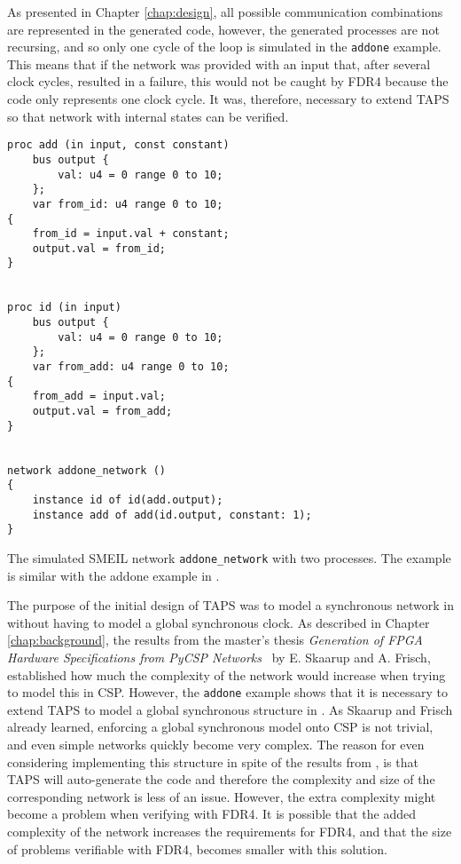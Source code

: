 As presented in Chapter \ref{chap:design}, all possible communication combinations are represented in the generated \cspm{} code, however, the generated \cspm{} processes are not recursing, and so only one cycle of the loop is simulated in the \texttt{addone} example. This means that if the network was provided with an input that, after several clock cycles, resulted in a failure, this would not be caught by FDR4 because the \cspm{} code only represents one clock cycle. It was, therefore, necessary to extend TAPS so that network with internal states can be verified.\\
\begin{listing}
\begin{verbatim}
proc add (in input, const constant)
    bus output {
        val: u4 = 0 range 0 to 10;
    };
    var from_id: u4 range 0 to 10;
{
    from_id = input.val + constant;
    output.val = from_id;
}


proc id (in input)
    bus output {
        val: u4 = 0 range 0 to 10;
    };
    var from_add: u4 range 0 to 10;
{
    from_add = input.val;
    output.val = from_add;
}


network addone_network ()
{
    instance id of id(add.output);
    instance add of add(id.output, constant: 1);
}
\end{verbatim}
\caption{The simulated SMEIL network \texttt{addone\_network} with two processes. The example is similar with the addone example in \cite{smeil}.}
\label{lst:addone_smeil_example}
\end{listing}

The purpose of the initial design of TAPS was to model a synchronous network in \cspm{} without having to model a global synchronous clock. As described in Chapter \ref{chap:background}, the results from the master's thesis \textit{Generation of FPGA Hardware
Specifications from PyCSP Networks}~\cite{Skaarup14} by E. Skaarup and A. Frisch, established how much the complexity of the network would increase when trying to model this in CSP.
However, the \texttt{addone} example shows that it is necessary to extend TAPS to model a global synchronous structure in \cspm{}. As Skaarup and Frisch already learned, enforcing a global synchronous model onto CSP is not trivial, and even simple networks quickly become very complex. The reason for even considering implementing this structure in spite of the results from \cite{Skaarup14}, is that TAPS will auto-generate the \cspm{} code and therefore the complexity and size of the corresponding \cspm{} network is less of an issue. However, the extra complexity might become a problem when verifying with FDR4. It is possible that the added complexity of the network increases the requirements for FDR4, and that the size of problems verifiable with FDR4, becomes smaller with this solution. \\

